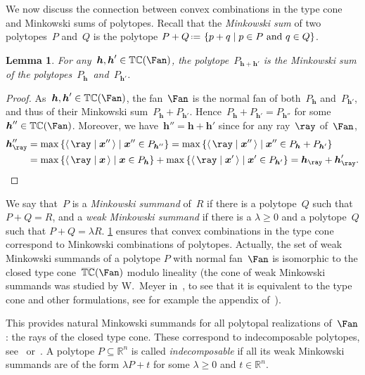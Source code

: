 \documentclass{amsart}
\newtheorem{lemma}[theorem]{Lemma}
\theoremstyle{definition}
\newcommand{\R}{\mathbb{R}} %
\renewcommand{\b}[1]{{\boldsymbol{#1}}} %
\newcommand{\set}[2]{\left\{ #1 \;\middle|\; #2 \right\}} %
\newcommand{\dotprod}[2]{\left\langle \, #1 \; \middle| \; #2 \, \right\rangle} %
\newcommand{\eqdef}{\mbox{\,\raisebox{0.2ex}{\scriptsize\ensuremath{\mathrm:}}\ensuremath{=}\,}} %
\newcommand{\darkblue}{\color{darkblue}} %
\newcommand{\defn}[1]{\textsl{\darkblue #1}} %
\newcommand{\typeCone}{\mathbb{TC}} %
\newcommand{\ctypeCone}{\smash{\overline{\mathbb{TC}}}} %
\begin{document}
We now discuss the connection between convex combinations in the type cone and Minkowski sums of polytopes.
Recall that the \defn{Minkowski sum} of two polytopes~$P$ and~$Q$ is the polytope $P + Q \eqdef \set{p + q}{p \in P\text{ and } q \in Q}$. 

\begin{lemma}
\label{lem:MinkowskiSum}
For any~$\b{h}, \b{h}' \in \typeCone(\Fan)$, the polytope~$P_{\b{h} + \b{h'}}$ is the Minkowski sum of the polytopes~$P_\b{h}$~and~$P_{\b{h}'}$.
\end{lemma}

\begin{proof}
As~$\b{h}, \b{h}' \in \typeCone(\Fan)$, the fan~$\Fan$ is the normal fan of both~$P_\b{h}$ and~$P_{\b{h}'}$, and thus of their Minkowski sum~$P_\b{h} + P_{\b{h}'}$.
Hence~$P_\b{h} + P_{\b{h}'} = P_{\b{h}''}$ for some~$\b{h}'' \in \typeCone(\Fan)$.
Moreover, we have~${\b{h}'' = \b{h} + \b{h}'}$ since for any ray~$\ray$ of~$\Fan$,
\begin{align*}
\b{h}''_{\ray} 
& = \max\set{\dotprod{\ray}{\b{x}''}}{\b{x}'' \in P_{\b{h}''}} = \max\set{\dotprod{\ray}{\b{x}''}}{\b{x}'' \in P_{\b{h}} + P_{\b{h}'}} \\
& = \max\set{\dotprod{\ray}{\b{x}}}{\b{x} \in P_{\b{h}}} + \max\set{\dotprod{\ray}{\b{x}'}}{\b{x}' \in P_{\b{h}'}} = \b{h}_{\ray} + \b{h}'_{\ray}.
\qedhere
\end{align*}
\end{proof}

We say that~$P$ is a \defn{Minkowski summand} of~$R$ if there is a polytope~$Q$ such that $P+Q = R$, and a \defn{weak Minkowski summand} if there is a $\lambda \ge 0$ and a polytope~$Q$ such that ${P + Q = \lambda R}$. 
\cref{lem:MinkowskiSum} ensures that convex combinations in the type cone correspond to Minkowski combinations of polytopes. Actually, the set of weak Minkowski summands of a polytope $P$ with normal fan~$\Fan$ is isomorphic to the closed type cone~$\ctypeCone(\Fan)$ modulo lineality (the cone of weak Minkowski summands was studied by W.~Meyer in~\cite{Meyer}, to see that it is equivalent to the type cone and other formulations, see for example the appendix of~\cite{PostnikovReinerWilliams}).

This provides natural Minkowski summands for all polytopal realizations of~$\Fan$: the rays of the closed type cone. These correspond to indecomposable polytopes, see~\cite{Meyer} or~\cite{McMullen-typeCone}. A polytope $P \subseteq \R^n$ is called \defn{indecomposable} if all its weak Minkowski summands are of the form $\lambda P+t$ for some $\lambda \ge 0$ and $t \in \R^n$.
\end{document}
